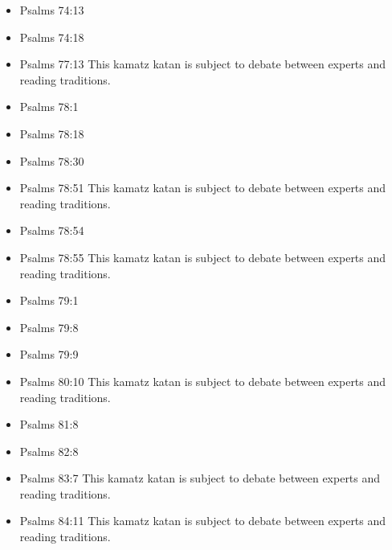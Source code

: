 \documentclass[14pt]{book}
\begin{document}
\begin{multicols}{2}
\begin{itemize}
			\item Psalms 74:13
			
			\item Psalms 74:18
			
			\item Psalms 77:13 This kamatz katan is subject to debate between experts and reading traditions.
			
			\item Psalms 78:1
			
			\item Psalms 78:18
			
			\item Psalms 78:30
			
			\item Psalms 78:51 This kamatz katan is subject to debate between experts and reading traditions.
			
			\item Psalms 78:54
			
			\item Psalms 78:55 This kamatz katan is subject to debate between experts and reading traditions.
			
			\item Psalms 79:1
			
			\item Psalms 79:8
					
					\item Psalms 79:9
					
					\item Psalms 80:10 This kamatz katan is subject to debate between experts and reading traditions.
					
					\item Psalms 81:8
					
					\item Psalms 82:8
					
					\item Psalms 83:7 This kamatz katan is subject to debate between experts and reading traditions.
					
					\item Psalms 84:11 This kamatz katan is subject to debate between experts and reading traditions.
					

\end{itemize}
\end{multicols}
\end{document}
